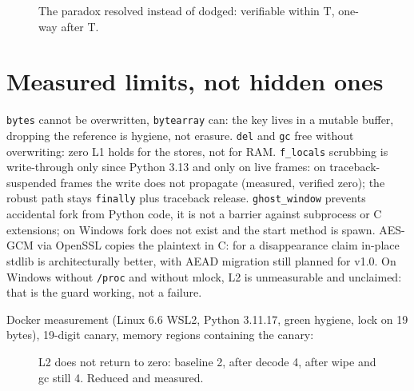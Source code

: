\documentclass[11pt,a4paper]{article}
\begin{document}
\begin{figure}[h]
\centering
{}
\caption{The paradox resolved instead of dodged: verifiable within T, one-way after T.}
\end{figure}

\section{Measured limits, not hidden ones}
\texttt{bytes} cannot be overwritten, \texttt{bytearray} can: the key lives in a
mutable buffer, dropping the reference is hygiene, not erasure. \texttt{del} and
\texttt{gc} free without overwriting: zero L1 holds for the stores, not for RAM.
\texttt{f\_locals} scrubbing is write-through only since Python 3.13 and only on
live frames: on traceback-suspended frames the write does not propagate (measured,
verified zero); the robust path stays \texttt{finally} plus traceback release.
\texttt{ghost\_window} prevents accidental fork from Python code, it is not a barrier
against subprocess or C extensions; on Windows fork does not exist and the start
method is spawn. AES-GCM via OpenSSL copies the plaintext in C: for a disappearance
claim in-place stdlib is architecturally better, with AEAD migration still planned
for v1.0. On Windows without \texttt{/proc} and without mlock, L2 is unmeasurable
and unclaimed: that is the guard working, not a failure.

Docker measurement (Linux 6.6 WSL2, Python 3.11.17, green hygiene, lock on 19 bytes),
19-digit canary, memory regions containing the canary:

\begin{figure}[h]
\centering
{}
\caption{L2 does not return to zero: baseline 2, after decode 4, after wipe and gc still 4. Reduced and measured.}
\end{figure}
\end{document}
